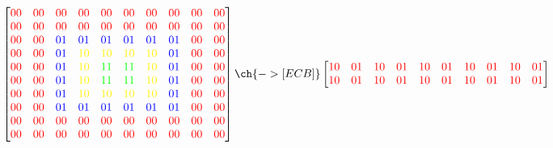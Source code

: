 			\[
				\begin{bmatrix}
					\color{red}00 & \color{red}00 & \color{red}00 & \color{red}00 & \color{red}00 & \color{red}00 & \color{red}00 & \color{red}00 & \color{red}00 & \color{red}00\\
					\color{red}00 & \color{red}00 & \color{red}00 & \color{red}00 & \color{red}00 & \color{red}00 & \color{red}00 & \color{red}00 & \color{red}00 & \color{red}00\\
					\color{red}00 & \color{red}00 & \color{blue}01 & \color{blue}01 & \color{blue}01 & \color{blue}01 & \color{blue}01 & \color{blue}01 & \color{red}00 & \color{red}00\\
					\color{red}00 & \color{red}00 & \color{blue}01 & \color{yellow}\color{yellow}10 & \color{yellow}10 & \color{yellow}10 & \color{yellow}\color{yellow}10 & \color{blue}01 & \color{red}00 & \color{red}00\\
					\color{red}00 & \color{red}00 & \color{blue}01 & \color{yellow}10 & \color{green}11 & \color{green}11 & \color{yellow}10 & \color{blue}01 & \color{red}00 & \color{red}00\\
					\color{red}00 & \color{red}00 & \color{blue}01 & \color{yellow}10 & \color{green}11 & \color{green}11 & \color{yellow}10 & \color{blue}01 & \color{red}00 & \color{red}00\\
					\color{red}00 & \color{red}00 & \color{blue}01 & \color{yellow}\color{yellow}10 & \color{yellow}10 & \color{yellow}10 & \color{yellow}\color{yellow}10 & \color{blue}01 & \color{red}00 & \color{red}00\\
					\color{red}00 & \color{red}00 & \color{blue}01 & \color{blue}01 & \color{blue}01 & \color{blue}01 & \color{blue}01 & \color{blue}01 & \color{red}00 & \color{red}00\\
					\color{red}00 & \color{red}00 & \color{red}00 & \color{red}00 & \color{red}00 & \color{red}00 & \color{red}00 & \color{red}00 & \color{red}00 & \color{red}00\\
					\color{red}00 & \color{red}00 & \color{red}00 & \color{red}00 & \color{red}00 & \color{red}00 & \color{red}00 & \color{red}00 & \color{red}00 & \color{red}00\\
				\end{bmatrix}
				\ch{->[ECB]}
				\begin{bmatrix}
					\color{red}10 & \color{red}01 & \color{red}10 & \color{red}01 & \color{red}10 & \color{red}01 & \color{red}10 & \color{red}01 & \color{red}10 & \color{red}01\\
					\color{red}10 & \color{red}01 & \color{red}10 & \color{red}01 & \color{red}10 & \color{red}01 & \color{red}10 & \color{red}01 & \color{red}10 & \color{red}01\\

\end{bmatrix}\]
